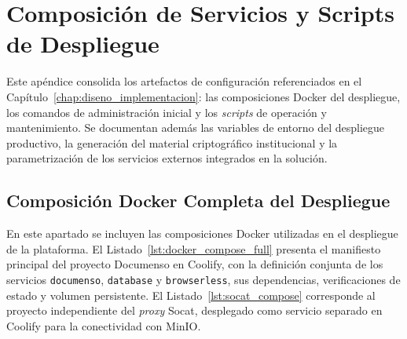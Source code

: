 \chapter{Composición de Servicios y Scripts de Despliegue}
\label{AppendixB}

Este apéndice consolida los artefactos de configuración referenciados en el Capítulo~\ref{chap:diseno_implementacion}: las composiciones Docker del despliegue, los comandos de administración inicial y los \textit{scripts} de operación y mantenimiento. Se documentan además las variables de entorno del despliegue productivo, la generación del material criptográfico institucional y la parametrización de los servicios externos integrados en la solución.





\section{Composición Docker Completa del Despliegue}
\label{AppendixB:Compose}

En este apartado se incluyen las composiciones Docker utilizadas en el despliegue de la plataforma. El Listado~\ref{lst:docker_compose_full} presenta el manifiesto principal del proyecto Documenso en Coolify, con la definición conjunta de los servicios \texttt{documenso}, \texttt{database} y \texttt{browserless}, sus dependencias, verificaciones de estado y volumen persistente. El Listado~\ref{lst:socat_compose} corresponde al proyecto independiente del \textit{proxy} Socat, desplegado como servicio separado en Coolify para la conectividad con MinIO.

